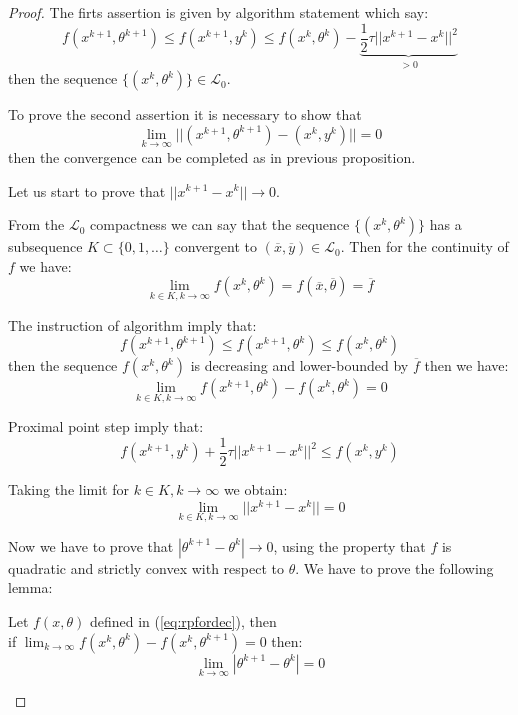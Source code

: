 \begin{proof}
The firts assertion is given by algorithm statement which say:
\begin{equation}
f(x^{k+1},\theta^{k+1})\le f(x^{k+1},y^k)\le f(x^k,\theta^k)- \underbrace{\frac{1}{2}\tau ||x^{k+1}-x^{k}||^2}_{>0}
\end{equation}
then the sequence $\{(x^k,\theta^k)\} \in \mathcal{L}_0$.

To prove the second assertion it is necessary to show that
\begin{equation}
\lim_{k \rightarrow \infty} ||(x^{k+1},\theta^{k+1})-(x^{k},y^{k})||=0
\end{equation}
then the convergence can be completed as in previous proposition.

Let us start to prove that $||x^{k+1}-x^{k}||\to0$.

From the $\mathcal{L}_0$ compactness we can say that the sequence $\{(x^k,\theta^k)\}$ has a subsequence $K \subset \{0,1,\ldots\}$ convergent to $(\overline{x},\overline{y}) \in \mathcal{L}_0$. Then for the continuity of $f$ we have:
\begin{equation}
\lim_{k \in K, k \rightarrow \infty}f(x^k,\theta^k)=f(\overline{x},\overline{\theta})= \overline{f}
\end{equation}

The instruction of algorithm imply that:
\begin{equation}
f(x^{k+1},\theta^{k+1})\le f(x^{k+1},\theta^{k})\le f(x^k,\theta^k)
\end{equation}
then the sequence $f(x^k,\theta^k)$ is decreasing and lower-bounded by $\overline{f}$ then we have:
\begin{equation}
\lim_{k \in K, k \rightarrow \infty} f(x^{k+1},\theta^{k})-f(x^{k},\theta^{k})=0
\end{equation}

Proximal point step imply that:
\begin{equation}
f(x^{k+1},y^{k})+\frac{1}{2}\tau||x^{k+1}-x^{k}||^2 \le f(x^{k},y^{k})
\end{equation}

Taking the limit for $k \in K, k \to \infty$ we obtain:
\begin{equation}
\lim_{k \in K,k \to \infty} ||x^{k+1}-x^{k}||=0
\end{equation}

Now we have to prove that $|\theta^{k+1}-\theta^{k}|\to 0$, using the property that $f$ is quadratic and strictly convex with respect to $\theta$. 
We have to prove the following lemma:
\begin{lemma}
Let $f(x,\theta)$ defined in (\ref{eq:rpfordec}), then\\ if $\lim_{k \to \infty} f(x^{k},\theta^k)-f(x^{k},\theta^{k+1})=0$ then:
\begin{equation}
 \lim_{k\to \infty} |\theta^{k+1} -\theta^k| = 0 
\end{equation}
\end{lemma}


\end{proof}
